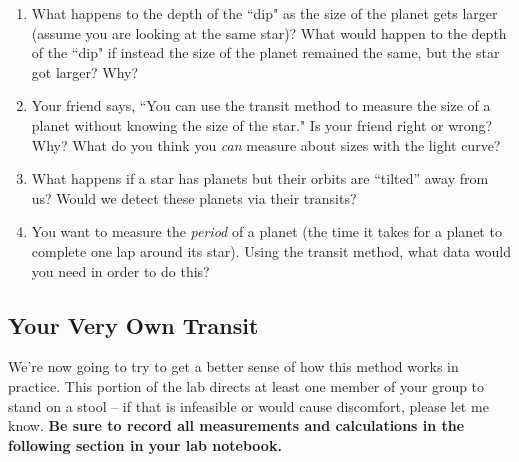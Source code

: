 \documentclass[11pt]{article}
\begin{document}
\begin{enumerate}
    \item What happens to the depth of the ``dip" as the size of the planet gets larger (assume you are looking at the same star)? What would happen to the depth of the ``dip" if instead the size of the planet remained the same, but the star got larger?  Why?
    
    \item Your friend says, ``You can use the transit method to measure the size of a planet without knowing the size of the star." Is your friend right or wrong? Why? What do you think you \textit{can} measure about sizes with the light curve?
    
    \item What happens if a star has planets but their orbits are “tilted” away from us? Would we detect these planets via their transits?
    
    \item You want to measure the \textit{period} of a planet (the time it takes for a planet to complete one lap around its star). Using the transit method, what data would you need in order to do this?
    
\end{enumerate}

\subsection{Your Very Own Transit}
\noindent
We’re now going to try to get a better sense of how this method works in practice. This portion of the lab directs at least one member of your group to stand on a stool -- if that is infeasible or would cause discomfort, please let me know.  \textbf{Be sure to record all measurements and calculations in the following section in your lab notebook.}
\end{document}
